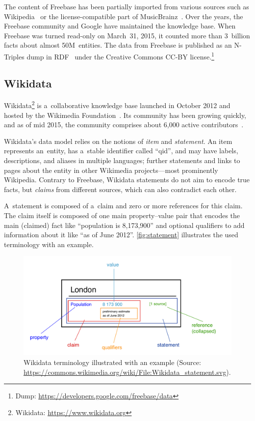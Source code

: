 \documentclass{acm_proc_article-sp}
\begin{document}
The content of Freebase has been partially imported from various sources
such as Wikipedia~\cite{wikipedia-works} or
the license-compa\-tible part of MusicBrainz~\cite{musicbrainz}.
Over the years, the Freebase community and Google have maintained the knowledge base.
When Freebase was turned read-only on March~31, 2015,
it counted more than 3~billion facts about almost 50M~entities.
The data from Freebase is published as an N-Triples dump in RDF~\cite{rdf} under
the Creative Commons CC-BY license.\footnote{Dump: \url{https://developers.google.com/freebase/data}}

\subsection{Wikidata}

Wikidata\footnote{Wikidata: \url{https://www.wikidata.org}}
is a~collaborative knowledge base
launched in October 2012 and hosted by the Wikimedia Foundation~\cite{vrandevcic2014wikidata}.
Its community has been growing quickly, and as of mid 2015,
the community comprises about 6,000 active contributors~\cite{wikidatastats}.

Wikidata's data model relies on the notions of \emph{item} and \emph{statement}.
An item represents an~entity, has a~stable identifier called ``qid'', and may have labels,
descriptions, and aliases in multiple languages; further statements and links to pages
about the entity in other Wikimedia projects---most prominently Wikipedia.
Contrary to Freebase, Wikidata statements do not aim to encode true facts,
but \emph{claims} from different sources, which can also contradict each other.

A~statement is composed of a~claim and zero or more references for this claim.
The claim itself is composed of one main property--value pair that encodes
the main (claimed) fact like ``population is 8,173,900'' and optional qualifiers
to add information about it like ``as of June 2012''.
\autoref{fig:statement} illustrates the used terminology with an example.

\begin{figure}[!htbp]
  \centering
  \includegraphics[width=8.45 cm]{img/Wikidata_statement.pdf}
  \caption{Wikidata terminology illustrated with an example (Source:
	\url{https://commons.wikimedia.org/wiki/File:Wikidata_statement.svg}).}
  \label{fig:statement}
\end{figure}
\end{document}
